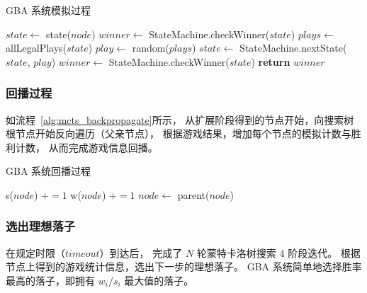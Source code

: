 \documentclass[UTF8,cs4size]{ctexart}
\begin{document}
\begin{algorithm}
	\caption{GBA 系统模拟过程}
	\label{alg:mcts_simulate}
  \begin{algorithmic}[1]
      \State $state \gets$ state($node$)
      \State $winner \gets$ StateMachine.checkWinner($state$)
        \State $plays \gets$ allLegalPlays($state$)
        \State $play \gets$ random($plays$)
        \State $state \gets$ StateMachine.nextState($state$, $play$)
        \State $winner \gets$ StateMachine.checkWinner($state$)
      \EndWhile
      \State \textbf{return} $winner$
    \EndFunction
	\end{algorithmic}  
\end{algorithm}

\subsubsection{回播过程}
如流程~\ref{alg:mcts_backpropagate}所示，
从扩展阶段得到的节点开始，向搜索树根节点开始反向遍历（父亲节点），
根据游戏结果，增加每个节点的模拟计数与胜利计数，
从而完成游戏信息回播。

\begin{algorithm}
	\caption{GBA 系统回播过程}
	\label{alg:mcts_backpropagate}
  \begin{algorithmic}[1]
        \State s($node$) $+= 1$
          \State w($node$) $+= 1$
        \EndIf
        \State $node \gets$ parent($node$)
      \EndWhile
    \EndFunction
	\end{algorithmic}  
\end{algorithm}

\subsubsection{选出理想落子}
在规定时限（$timeout$）到达后，
完成了 $N$ 轮蒙特卡洛树搜索 4 阶段迭代。
根据节点上得到的游戏统计信息，选出下一步的理想落子。
GBA 系统简单地选择胜率最高的落子，即拥有 $w_i/s_i$ 最大值的落子。

\clearpage
\end{document}
